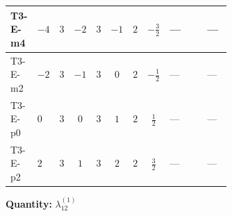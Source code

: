 \documentclass[8pt]{article}
\begin{document}
\begin{landscape}
\begin{longtable}{@{}llcccccc >{\raggedright\arraybackslash}p{0.21\linewidth} >{\raggedright\arraybackslash}p{0.21\linewidth} >{\raggedright\arraybackslash}p{0.21\linewidth}@{}}
\midrule
T3-E-m4 & $-4$ & $3$ & $-2$ & $3$ & $-1$ & $2$ & $-\frac{3}{2}$ & --- & \scriptsize\adjustbox{max width=\linewidth}{$\begin{gathered} -2 \operatorname{Tr}\!\left({y_1}\,\left({y_1}\right)^{\dagger}\,{y_2}\,\left({y_2}\right)^{\dagger}\right)\end{gathered}$} & --- \\
\midrule
T3-E-m2 & $-2$ & $3$ & $-1$ & $3$ & $0$ & $2$ & $-\frac{1}{2}$ & --- & \scriptsize\adjustbox{max width=\linewidth}{$\begin{gathered} -2 \operatorname{Tr}\!\left({y_1}\,\left({y_1}\right)^{\dagger}\,{y_2}\,\left({y_2}\right)^{\dagger}\right)\end{gathered}$} & --- \\
\midrule
T3-E-p0 & $0$ & $3$ & $0$ & $3$ & $1$ & $2$ & $\frac{1}{2}$ & --- & \scriptsize\adjustbox{max width=\linewidth}{$\begin{gathered} -2 \operatorname{Tr}\!\left({y_1}\,\left({y_1}\right)^{\dagger}\,{y_2}\,\left({y_2}\right)^{\dagger}\right)\end{gathered}$} & --- \\
\midrule
T3-E-p2 & $2$ & $3$ & $1$ & $3$ & $2$ & $2$ & $\frac{3}{2}$ & --- & \scriptsize\adjustbox{max width=\linewidth}{$\begin{gathered} -2 \operatorname{Tr}\!\left({y_1}\,\left({y_1}\right)^{\dagger}\,{y_2}\,\left({y_2}\right)^{\dagger}\right)\end{gathered}$} & --- \\
\midrule
\bottomrule
\end{longtable}
\clearpage
\noindent\textbf{Quantity: }$\lambda_{12}^{(1)}$\par\smallskip

\end{landscape}
\end{document}
